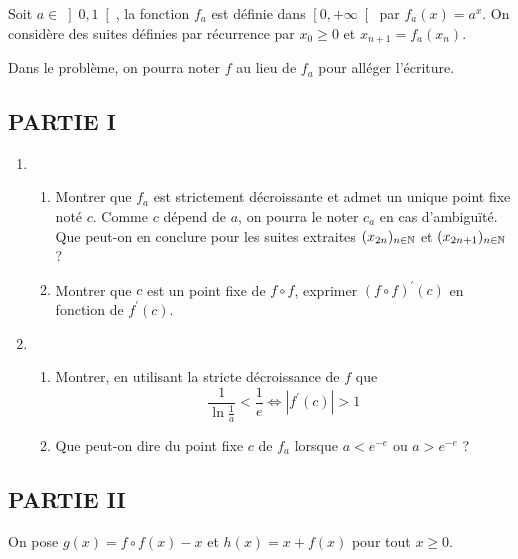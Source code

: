 Soit $a\in \left] 0,1\right[ $, la fonction $f_{a}$ est d{\'e}finie dans $%
\left[ 0,+\infty \right[ $ par $f_{a}(x)=a^{x}$. On consid{\`e}re des suites
d{\'e}finies par r{\'e}currence par $x_{0}\geq 0$ et $x_{n+1}=f_{a}(x_{n})$.

Dans le problème, on pourra noter $f$ au lieu de $f_a$ pour alléger l'écriture.

\subsection*{PARTIE I}

\begin{enumerate}
\item
\begin{enumerate}
\item  Montrer que $f_{a}$ est strictement d{\'e}croissante et admet un
unique point fixe not{\'e} $c$. Comme $c$ d{\'e}pend de $a$, on pourra le
noter $c_{a}$ en cas d'ambigu\"{i}t{\'e}$.$ Que peut-on en conclure pour les
suites extraites $(x_{2n})_{n\in \mathbb{N}}$ et $(x_{2n+1})_{n\in \N%
}$ ?

\item  Montrer que $c$ est un point fixe de $f\circ f$, exprimer $(f\circ
f)^{\prime }(c)$ en fonction de $f^{\prime }(c)$.
\end{enumerate}

\item
\begin{enumerate}
\item  Montrer, en utilisant la stricte d{\'e}croissance de $f$ que
\[
\frac{1}{\ln \frac{1}{a}}<\frac{1}{e}\Leftrightarrow |f^{\prime
}(c)|>1
\]

\item  Que peut-on dire du point fixe $c$ de $f_{a}$ lorsque $a<e^{-e}$ ou $%
a>e^{-e}$ ?
\end{enumerate}
\end{enumerate}

\subsection*{PARTIE II}

On pose $g(x)=f\circ f(x)-x$ et $h(x)=x+f(x)$ pour tout $x\geq 0$.

